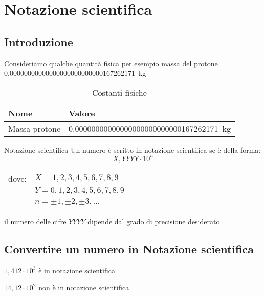 \chapter{Notazione scientifica}
\section{Introduzione}
Consideriamo qualche quantità fisica per esempio massa del protone \SI{0,00000000000000000000000000167262171}{\kilogram}


\begin{table}
	\centering
	\begin{tabular}{ls}
		\toprule
		Nome&Valore\\
		\midrule
	Massa protone&\SI{0,00000000000000000000000000167262171}{\kilogram}\\
		\bottomrule
	\end{tabular}
\caption{Costanti fisiche}
\label{tab:costantifisiche1}
\end{table}
\label{cha:NotazioneScientifica}
\begin{definizionet}{Notazione scientifica}{}
Un numero è scritto in notazione scientifica se è della forma:
\[X,YYYY \cdot 10^n \]
\begin{tabular}{ll}
dove:&    $X=1,2,3,4,5,6,7,8,9$  \\ 
	    &     $ Y=0,1,2,3,4,5,6,7,8,9$ \\ 
	   &  $n=\pm 1, \pm 2,\pm 3,\ldots$\\
\end{tabular}
 
il numero delle cifre $YYYY$ dipende dal grado di precisione desiderato
\end{definizionet}
\section{Convertire un numero in Notazione scientifica}
\begin{esempiot}{}{}
	$1,412\cdot 10^3$ è in notazione scientifica
	
	$14,12\cdot 10^2$ non è in notazione scientifica
\end{esempiot}